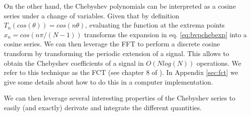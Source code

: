 \documentclass[ twoside,openright,titlepage,numbers=noenddot,%
headinclude,footinclude,cleardoublepage=empty,abstract=on,
BCOR=5mm,paper=a4,fontsize=11pt, dvipsnames
]{scrreprt}
\newcommand{\uammd}{\gls{UAMMD}\xspace}
\begin{document}
On the other hand, the Chebyshev polynomials can be interpreted as a cosine series under a change of variables. Given that by definition $T_n(cos(\theta))= cos(n\theta)$, evaluating the function at the extrema points $x_n = cos(n\pi/(N-1))$ transforms the expansion in eq. \eqref{eq:bvpchebexp} into a cosine series. We can then leverage the \gls{FFT} to perform a discrete cosine transform by transforming the periodic extension of a signal. This allows to obtain the Chebyshev coefficients of a signal in $O(Nlog(N))$ operations. We refer to this technique as the \gls{FCT} (see chapter 8 of \cite{Trefethen2000}). In Appendix \ref{sec:fct} we give some details about how to do this in a computer implementation.

We can then leverage several interesting properties of the Chebyshev series to easily (and exactly) derivate and integrate the different quantities.

\end{document}

